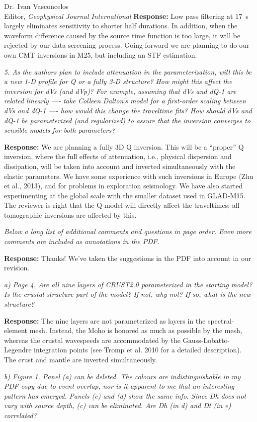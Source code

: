 \documentclass[11pt,a4paper]{letter}
\newcommand{\response}[1]{\textbf{Response:} #1}
\newcommand{\rev}[1]{{\it{#1}}}
\begin{document}
\begin{letter}{Dr.~Ivan Vasconcelos\\
Editor, \textit{Geophysical Journal International}}
\response{Low pass filtering at 17~s largely eliminates sensitivity to shorter half durations. 
In addition, when the waveform difference caused by the source time function is too large, it will be rejected by our data screening process. Going forward we are planning to do our own CMT inversions in M25, but including an STF estimation.
}

\rev{5. As the authors plan to include attenuation in the parameterization, will this be a new 1-D profile for Q or a fully 3-D structure? How might this affect the inversion for dVs (and dVp)? For example, assuming that dVs and dQ-1 are related linearly ---- take Colleen Dalton's model for a first-order scaling between dVs and dQ-1 ---- how would this change the traveltime fits? How should dVs and dQ-1 be parameterized (and regularized) to assure that the inversion converges to sensible models for both parameters?
}

\response{We are planning a fully 3D Q inversion. This will be a ``proper'' Q inversion,
where the full effects of attenuation, i.e., physical dispersion and dissipation, will be taken into account and inverted simultaneously with the elastic parameters. We have some experience with such inversions in Europe (Zhu et al., 2013), and for problems in exploration seismology. We have also started experimenting at the global scale with the smaller dataset used in GLAD-M15. The reviewer is right that the Q model will directly affect the traveltimes;
all tomographic inversions are affected by this.
}

\rev{Below a long list of additional comments and questions in page order. Even more comments are included as annotations in the PDF.}

\response{Thanks! We've taken the suggestions in the PDF into account in our revision.}

\rev{a) Page 4. Are all nine layers of CRUST2.0 parameterized in the starting model? Is the crustal structure part of the model? If not, why not? If so, what is the new structure?
}

\response{The nine layers are not parameterized as layers in the spectral-element mesh. Instead,
the Moho is honored as much as possible by the mesh, whereas the crustal wavespeeds are accommodated by the Gauss-Lobatto-Legendre integration points (see Tromp et al. 2010 for a detailed description). The crust and mantle are inverted simultaneously.}

\rev{b) Figure 1. Panel (a) can be deleted. The colours are indistinguishable in my PDF copy due to event overlap, nor is it apparent to me that an interesting pattern has emerged. Panels (c) and (d) show the same info. Since Dh does not vary with source depth, (c) can be eliminated. Are Dh (in d) and Dt (in e) correlated?
}


\end{letter}
\end{document}
